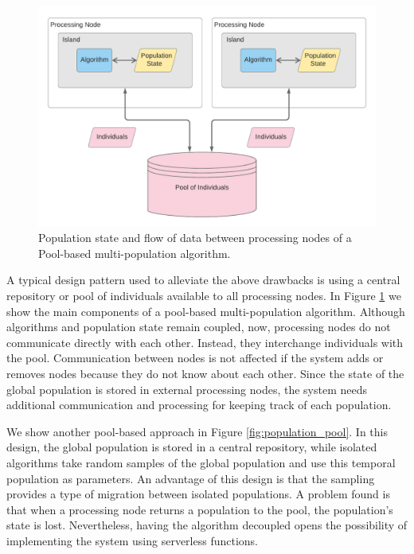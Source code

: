 \documentclass[review]{elsarticle}
\begin{document}
\begin{figure}[ht]
    \centering
    \includegraphics[width=\textwidth]{pool_island}
    \caption{Population state and flow of data between processing nodes of a Pool-based multi-population algorithm.}
    \label{fig:pool_island}
\end{figure}

A typical design pattern used to alleviate the above drawbacks is using a
central repository or pool of individuals available to all processing
nodes.  In Figure \ref{fig:pool_island} we show the main components of a pool-based
multi-population algorithm. Although algorithms and population state remain
coupled, now, processing nodes do not communicate directly with each other.
Instead, they interchange individuals with the pool. Communication between nodes
is not affected if the system adds or removes nodes because they do not know
about each other.  Since the state of the global population is stored in
external processing nodes, the system needs additional communication and
processing for keeping track of each population.

We show another pool-based approach in Figure  \ref{fig:population_pool}. In
this design, the global population is stored in a central repository, while
isolated algorithms take random samples of the global population and use this
temporal population as parameters. An advantage of this design is that the
sampling provides a type of migration between isolated populations. A problem
found is that when a processing node returns a population to the pool, the
population's state is lost. Nevertheless, having the algorithm decoupled opens the
possibility of implementing the system using serverless functions.
\end{document}
